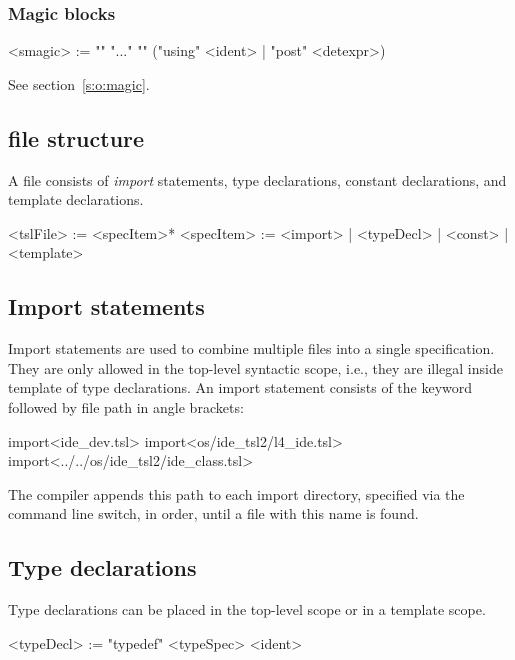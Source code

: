 \subsubsection{Magic blocks}

\begin{bnflisting}
<smagic> := "{" "..." "}" ("using" <ident> | "post" <detexpr>)
\end{bnflisting}

See section~\ref{s:o:magic}.

\subsection{\tsl file structure}

A \tsl file consists of \emph{import} statements, type 
declarations, constant declarations, and template declarations.

\begin{bnflisting}
<tslFile>  := <specItem>*
<specItem> := <import>
           |  <typeDecl>
           |  <const>
           |  <template>
\end{bnflisting}

\subsection{Import statements}

Import statements are used to combine multiple \tsl files into a 
single specification.  They are only allowed in the top-level 
syntactic scope, i.e., they are illegal inside template of type 
declarations.  An import statement consists of the  
keyword followed by file path in angle brackets:
\begin{tsllisting2}
import<ide_dev.tsl>
import<os/ide_tsl2/l4_ide.tsl>
import<../../os/ide_tsl2/ide_class.tsl>
\end{tsllisting2}
The \tsl compiler appends this path to each import directory, 
specified via the  command line switch, in order, until a  
file with this name is found.

\subsection{Type declarations}\label{s:r:typedecl}

Type declarations can be placed in the top-level scope or in a
template scope.

\begin{bnflisting}
<typeDecl> := "typedef" <typeSpec> <ident>
\end{bnflisting}


